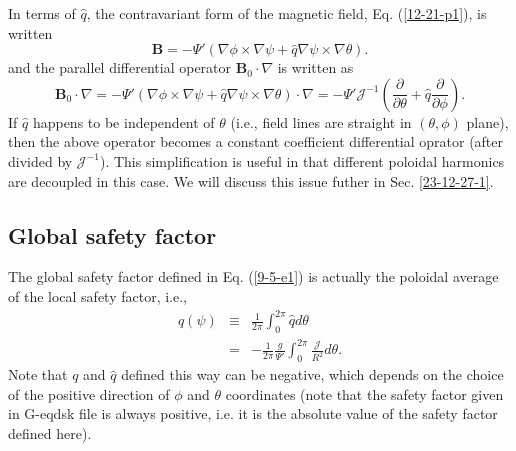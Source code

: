 \documentclass{llncs}
\begin{document}
In terms of $\hat{q}$, the contravariant form of the magnetic field, Eq.
(\ref{12-21-p1}), is written
\begin{equation}
  \label{18-3-9-a1} \mathbf{B}= - \Psi' (\nabla \phi \times \nabla \psi +
  \hat{q} \nabla \psi \times \nabla \theta) .
\end{equation}
and the parallel differential operator $\mathbf{B}_0 \cdot \nabla$ is written
as
\begin{equation}
  \label{18-8-21-e1} \mathbf{B}_0 \cdot \nabla = - \Psi' (\nabla \phi \times
  \nabla \psi + \hat{q} \nabla \psi \times \nabla \theta) \cdot \nabla = -
  \Psi' \mathcal{J}^{- 1} \left( \frac{\partial}{\partial \theta} + \hat{q}
  \frac{\partial}{\partial \phi} \right) .
\end{equation}
If $\hat{q}$ happens to be independent of $\theta$ (i.e., field lines are
straight in $(\theta, \phi)$ plane), then the above operator becomes a
constant coefficient differential oprator (after divided by $\mathcal{J}^{-
1}$). This simplification is useful in that different poloidal harmonics are
decoupled in this case. We will discuss this issue futher in Sec.
\ref{23-12-27-1}.

\subsection{Global safety factor}

The global safety factor defined in Eq. (\ref{9-5-e1}) is actually the
poloidal average of the local safety factor, i.e.,
\begin{eqnarray}
  q (\psi) & \equiv & \frac{1}{2 \pi} \int_0^{2 \pi} \hat{q} d \theta 
  \label{4-10-p5}\\
  & = & - \frac{1}{2 \pi}  \frac{g}{\Psi'} \int_0^{2 \pi}
  \frac{\mathcal{J}}{R^2} d \theta .  \label{7-11-p1}
\end{eqnarray}
Note that $q$ and $\hat{q}$ defined this way can be negative, which depends on
the choice of the positive direction of $\phi$ and $\theta$ coordinates (note
that the safety factor given in G-eqdsk file is always positive, i.e. it is
the absolute value of the safety factor defined here).
\end{document}
